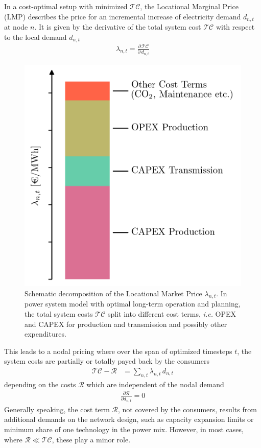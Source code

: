 \documentclass[11pt,twocolumn]{article}
\newcommand{\ie}{\textit{i.e.} }
\newcommand{\pdv}[2]{\frac{\partial #1}{\partial #2}}
\newcommand{\lmp}[1][n]{\lambda_{#1,t}}
\newcommand{\demand}[1][n]{d_{#1,t}}
\newcommand{\totalcost}{\mathcal{TC}}
\newcommand{\remainingcost}{\mathcal{R}}
\begin{document}
In a cost-optimal setup with minimized $\totalcost$, the Locational Marginal Price (LMP) describes the price for an incremental increase of electricity demand $\demand$ at node $n$. It is given by the derivative of the total system cost $\totalcost$ with respect to the local demand $\demand$
\begin{align}
\lmp = \pdv{\,\totalcost}{\,\demand}
\label{eq:lmp}
\end{align}
% 
\begin{figure}[h]
\centering
\includegraphics[width=.8\linewidth]{price_decomposition.png}
\caption{Schematic decomposition of the Locational Market Price $\lmp$. In power system model with optimal long-term operation and planning, the total system costs $\totalcost$ split into different cost terms, \ie OPEX and CAPEX for production and transmission and possibly other expenditures. }
\label{fig:price_decomposition}
\end{figure}
% 
This leads to a nodal pricing where over the span of optimized timesteps $t$, the system costs are partially or totally payed back by the consumers 
\begin{align}
\totalcost - \remainingcost &=  \sum_{n,t} \lmp \, \demand
\label{eq:total_revenue}
\end{align}
depending on the costs $\remainingcost$ which are independent of the nodal demand  
\begin{align}
 \pdv{\remainingcost}{\demand} = 0
\end{align}
% 
Generally speaking, the cost term $\remainingcost$, not covered by the consumers, results from additional demands on the network design, such as capacity expansion limits or minimum share of one technology in the power mix. However, in most cases, where $\remainingcost \ll  \totalcost$, these play a minor role. 
\end{document}
